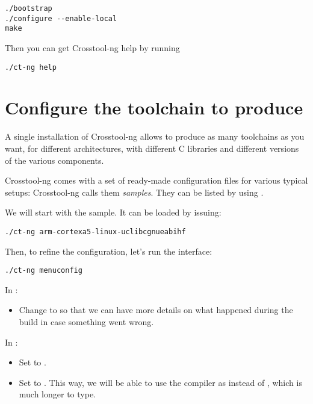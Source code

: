 \begin{verbatim}
./bootstrap
./configure --enable-local
make
\end{verbatim}

Then you can get Crosstool-ng help by running

\begin{verbatim}
./ct-ng help
\end{verbatim}

\section{Configure the toolchain to produce}

A single installation of Crosstool-ng allows to produce as many
toolchains as you want, for different architectures, with different C
libraries and different versions of the various components.

Crosstool-ng comes with a set of ready-made configuration files for
various typical setups: Crosstool-ng calls them {\em samples}. They can be
listed by using .

We will start with the  sample. It
can be loaded by issuing:

\begin{verbatim}
./ct-ng arm-cortexa5-linux-uclibcgnueabihf
\end{verbatim}

Then, to refine the configuration, let's run the  interface:

\begin{verbatim}
./ct-ng menuconfig
\end{verbatim}

In :
\begin{itemize}
\item Change  to  so that we can have more
  details on what happened during the build in case something went wrong.
\end{itemize}


In :
\begin{itemize}
\item Set  to .
\item Set  to . This way, we will
  be able to use the compiler as  instead of
  , which is much longer
  to type.
\end{itemize}

